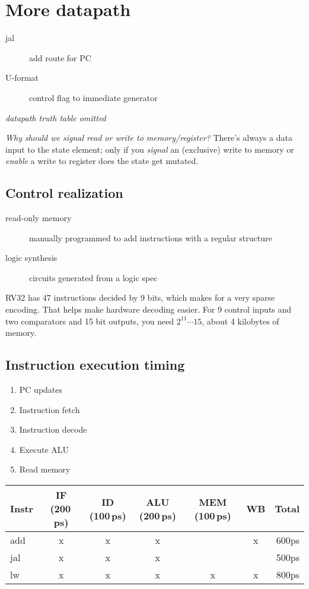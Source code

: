 \chapter{More datapath}
\begin{description}
	\item[jal] add route for PC
	\item[U-format] control flag to immediate generator
\end{description}
\emph{datapath truth table omitted}

\emph{Why should we signal read or write to memory/register?}
There's always a data input to the state element; only if you \emph{signal} an (exclusive) write to memory or \emph{enable} a write to register does the state get mutated.

\section{Control realization}
\begin{description}
	\item[read-only memory] manually programmed to add instructions with a regular structure
	\item[logic synthesis] circuits generated from a logic spec
\end{description}

RV32 has 47 instructions decided by 9 bits, which makes for a very sparse encoding. That helps make hardware decoding easier.
For 9 control inputs and two comparators and 15 bit outputs, you need \(2^11 \cdots 15\), about 4 kilobytes of memory.

\section{Instruction execution timing}
\begin{enumerate}
	\item PC updates
	\item Instruction fetch
	\item Instruction decode
	\item Execute ALU
	\item Read memory
\end{enumerate}

\begin{tabular}{lcccccr}
	Instr & IF (200\,ps)  & ID (100\,ps) & ALU (200\,ps) & MEM (100\,ps) & WB & Total\\\hline
	add & x & x & x &  & x & 600ps\\
	jal & x & x & x &  & & 500ps\\
	lw & x & x & x & x & x & 800ps
\end{tabular}

